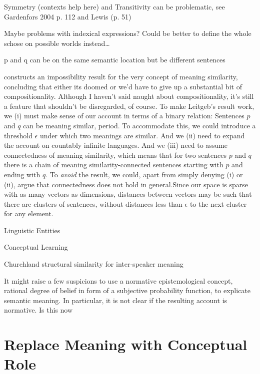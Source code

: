 \documentclass[11pt, a4paper]{scrartcl}
\renewcommand{\i}[1]{\emph{#1}}
\begin{document}
Symmetry (contexts help here) and Transitivity can be problematic, see Gardenfors 2004 p. 112 and Lewis (p. 51)

Maybe problems with indexical expressions? Could be better to define the whole schose on possible worlds instead\ldots

p and q can be on the same semantic location but be different sentences

\textcite{Leitgeb2008-LEIAIR} constructs an impossibility result for the very concept of meaning similarity, concluding that either its doomed or we'd have to give up a substantial bit of compositionality. Although I haven't said naught about compositionality, it's still a feature that shouldn't be disregarded, of course. To make Leitgeb's result work, we (i) must make sense of our account in terms of a binary relation: Sentences $p$ and $q$ can be meaning similar, period. To accommodate this, we could introduce a threshold $\epsilon$ under which two meanings are similar. And we (ii) need to expand the account on countably infinite languages. And we (iii) need to assume connectedness of meaning similarity, which means that for two sentences $p$ and $q$ there is a chain of meaning similarity-connected sentences starting with $p$ and ending with $q$. To \i{avoid} the result, we could, apart from simply denying (i) or (ii), argue that connectedness does not hold in general.Since our space is sparse with as many vectors as dimensions, distances between vectors may be such that there are clusters of sentences, without distances less than $\epsilon$ to the next cluster for any element.

Linguistic Entities

Conceptual Learning

Churchland structural similarity for inter-speaker meaning

It might raise a few suspicions to use a normative epistemological concept, rational degree of belief in form of a subjective probability function, to explicate semantic meaning. In particular, it is not clear if the resulting account is normative. Is this now
\section{Replace Meaning with Conceptual Role}
\begin{singlespacing}
\printbibliography{}
\end{singlespacing}
\end{document}
